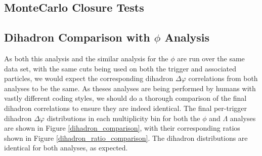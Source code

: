 \documentclass[ALICE,manyauthors]{ALICE_analysis_notes}
\begin{document}
\subsection{MonteCarlo Closure Tests}

\subsection{Dihadron Comparison with $\phi$ Analysis}
As both this analysis and the similar analysis for the $\phi$ are run over the same data set, with the same cuts being used on both the trigger and associated particles, we would expect the corresponding dihadron $\Delta\varphi$ correlations from both analyses to be the same. As theses analyses are being performed by humans with vastly different coding styles, we should do a thorough comparison of the final dihadron correlations to ensure they are indeed identical. The final per-trigger dihadron $\Delta\varphi$ distributions in each multiplicity bin for both the $\phi$ and $\Lambda$ analyses are shown in Figure \ref{dihadron_comparison}, with their corresponding ratios shown in Figure \ref{dihadron_ratio_comparison}. The dihadron distributions are identical for both analyses, as expected.
\end{document}
